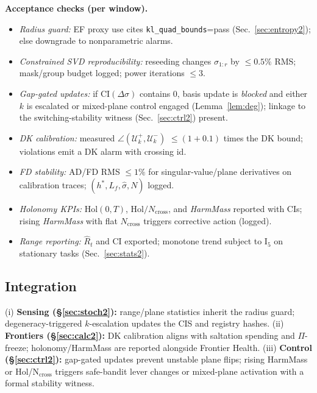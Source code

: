 \documentclass[10pt]{article}
\begin{document}
\begin{mdframed}
\textbf{Acceptance checks (per window).}
\begin{itemize}[leftmargin=*]
\item \emph{Radius guard:} EF proxy use cites \texttt{kl\_quad\_bounds}=\textsf{pass} (Sec.~\ref{sec:entropy2}); else downgrade to nonparametric alarms.
\item \emph{Constrained SVD reproducibility:} reseeding changes $\sigma_{1:r}$ by $\le 0.5\%$ RMS; mask/group budget logged; power iterations $\le 3$.
\item \emph{Gap-gated updates:} if CI$(\Delta\sigma)$ contains $0$, basis update is \emph{blocked} and either $k$ is escalated or mixed-plane control engaged (Lemma~\ref{lem:deg}); linkage to the switching-stability witness (Sec.~\ref{sec:ctrl2}) present.
\item \emph{DK calibration:} measured $\angle(\mathcal U_k^+,\mathcal U_k^-)$ $\le (1{+}0.1)$ times the DK bound; violations emit a DK alarm with crossing id.
\item \emph{FD stability:} AD/FD RMS $\le 1\%$ for singular-value/plane derivatives on calibration traces; $(h^\ast,L_f,\hat\sigma,N)$ logged.
\item \emph{Holonomy KPIs:} $\mathrm{Hol}(0,T)$, $\mathrm{Hol}/N_{\mathrm{cross}}$, and \emph{HarmMass} reported with CIs; rising \emph{HarmMass} with flat $N_{\mathrm{cross}}$ triggers corrective action (logged).
\item \emph{Range reporting:} $\widehat R_t$ and CI exported; monotone trend subject to I$_5$ on stationary tasks (Sec.~\ref{sec:stats2}).
\end{itemize}
\end{mdframed}

\subsection*{Integration}
\noindent
(i) \textbf{Sensing (\S\ref{sec:stoch2}):} range/plane statistics inherit the radius guard; degeneracy-triggered $k$-escalation updates the CIS and registry hashes.
(ii) \textbf{Frontiers (\S\ref{sec:calc2}):} DK calibration aligns with saltation spending and $\Pi$-freeze; holonomy/HarmMass are reported alongside Frontier Health.
(iii) \textbf{Control (\S\ref{sec:ctrl2}):} gap-gated updates prevent unstable plane flips; rising HarmMass or Hol/N$_{\mathrm{cross}}$ triggers safe-bandit lever changes or mixed-plane activation with a formal stability witness.
\end{document}
